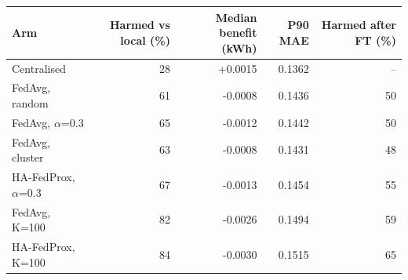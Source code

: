 \begin{tabular}{lrrrr}
\toprule
Arm & Harmed vs local (\%) & Median benefit (kWh) & P90 MAE & Harmed after FT (\%) \\
\midrule
Centralised & 28 & +0.0015 & 0.1362 & -- \\
FedAvg, random & 61 & -0.0008 & 0.1436 & 50 \\
FedAvg, $\alpha$=0.3 & 65 & -0.0012 & 0.1442 & 50 \\
FedAvg, cluster & 63 & -0.0008 & 0.1431 & 48 \\
HA-FedProx, $\alpha$=0.3 & 67 & -0.0013 & 0.1454 & 55 \\
FedAvg, K=100 & 82 & -0.0026 & 0.1494 & 59 \\
HA-FedProx, K=100 & 84 & -0.0030 & 0.1515 & 65 \\
\bottomrule
\end{tabular}
